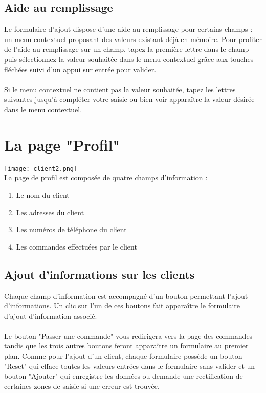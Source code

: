 \subsection{Aide au remplissage}
Le formulaire d'ajout dispose d'une aide au remplissage pour certains champs :
un menu contextuel proposant des valeurs existant déjà en mémoire. Pour profiter
de l'aide au remplissage sur un champ, tapez la première lettre dans le champ
puis sélectionnez la valeur souhaitée dans le menu contextuel grâce aux touches
fléchées suivi d'un appui sur entrée pour valider.

\paragraph{}
Si le menu contextuel ne contient pas la valeur souhaitée, tapez les lettres
suivantes jusqu'à compléter votre saisie ou bien voir apparaître la valeur
désirée dans le menu contextuel.

\section{La page "Profil"}
\texttt{[image: client2.png]}\\
La page de profil est composée de quatre champs d'information :

\begin{enumerate}
  \item Le nom du client
  \item Les adresses du client
  \item Les numéros de téléphone du client
  \item Les commandes effectuées par le client
\end{enumerate}

\subsection{Ajout d'informations sur les clients}
Chaque champ d'information est accompagné d'un bouton permettant l'ajout d'informations.
Un clic sur l'un de ces boutons fait apparaître le formulaire d'ajout
d'information associé.

\paragraph{}
Le bouton "Passer une commande" vous redirigera vers la page des commandes
tandis que les trois autres boutons feront apparaître un formulaire au premier
plan. Comme pour l'ajout d'un client, chaque formulaire possède un bouton "Reset"
qui efface toutes les valeurs entrées dans le formulaire sans valider et un
bouton "Ajouter" qui enregistre les données ou demande une rectification de
certaines zones de saisie si une erreur est trouvée.

